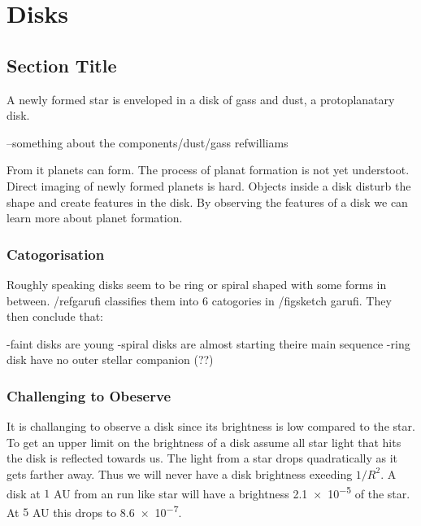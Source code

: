 
\chapter{Disks} %

\label{ch:disks} %


\section{Section Title}

A newly formed star is enveloped in a disk of gass and dust, a protoplanatary disk.

--something about the components/dust/gass ref{williams}

From it planets can form. The process of planat formation is not yet understoot. Direct imaging of newly formed planets is hard. Objects inside a disk disturb the shape and create features in the disk. By observing the features of a disk we can learn more about planet formation.


\subsection{Catogorisation}

Roughly speaking disks seem to be ring or spiral shaped with some forms in between. /ref{garufi} classifies them into 6 catogories in /fig{sketch garufi}. They then conclude that: 

-faint disks are young
-spiral disks are almost starting theire main sequence
-ring disk have no outer stellar companion (??)  


\subsection{Challenging to Obeserve}

It is challanging to observe a disk since its brightness is low compared to the star. To get an upper limit on the brightness of a disk assume all star light that hits the disk is reflected towards us. The light from a star drops quadratically as it gets farther away. Thus we will never have a disk brightness exeeding $1/R^2$. A disk at $1$ AU from an run like star will have a brightness \num{2.1e-5} of the star. At $5$ AU this drops to \num{8.6e-7}. 


